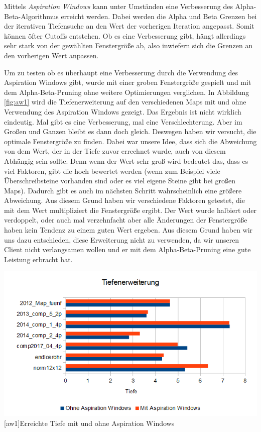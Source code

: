 \documentclass[12pt,a4paper,bibliography=totocnumbered,listof=totocnumbered]{scrartcl}
\begin{document}
    Mittels \textit{Aspiration Windows} kann unter Umständen eine Verbesserung des Alpha-Beta-Algorithmus erreicht werden. Dabei werden die Alpha und Beta Grenzen bei der iterativen Tiefensuche an den Wert der vorherigen Iteration angepasst. Somit können öfter Cutoffs entstehen. Ob es eine Verbesserung gibt, hängt allerdings sehr stark von der gewählten Fenstergröße ab, also inwiefern sich die Grenzen an den vorherigen Wert anpassen.
    
    Um zu testen ob es überhaupt eine Verbesserung durch die Verwendung des Aspiration Windows gibt, wurde mit einer groben Fenstergröße gespielt und mit dem Alpha-Beta-Pruning ohne weitere Optimierungen verglichen. In Abbildung \ref{fig:aw1} wird die Tiefenerweiterung auf den verschiedenen Maps mit und ohne Verwendung des Aspiration Windows gezeigt. Das Ergebnis ist nicht wirklich eindeutig. Mal gibt es eine Verbesserung, mal eine Verschlechterung. Aber im Großen und Ganzen bleibt es dann doch gleich. Deswegen haben wir versucht, die optimale Fenstergröße zu finden. Dabei war unsere Idee, dass sich die Abweichung von dem Wert, der in der Tiefe zuvor errechnet wurde, auch von diesem Abhängig sein sollte. Denn wenn der Wert sehr groß wird bedeutet das, dass es viel Faktoren, gibt die hoch bewertet werden (wenn zum Beispiel viele Überschreibsteine vorhanden sind oder es viel eigene Steine gibt bei großen Maps). Dadurch gibt es auch im nächsten Schritt wahrscheinlich eine größere Abweichung. 
    Aus diesem Grund haben wir verschiedene Faktoren getestet, die mit dem Wert multipliziert die Fenstergröße ergibt. Der Wert wurde halbiert oder verdoppelt, oder auch mal verzehnfacht aber alle Änderungen der Fenstergröße haben kein Tendenz zu einem guten Wert ergeben. 
    Aus diesem Grund haben wir uns dazu entschieden, diese Erweiterung nicht zu verwenden, da wir unseren Client nicht verlangsamen wollen und er mit dem Alpha-Beta-Pruning eine gute Leistung erbracht hat.
    
    \vspace{1em}
    \begin{minipage}{\linewidth}
    	\centering
    	\includegraphics[width=1\linewidth]{pics/Kapitel_4/VergleichAW2.png}
    	[aw1]{Erreichte Tiefe mit und ohne Aspiration Windows}
    	\label{fig:aw1}
    \end{minipage}
    \vspace{1em}
\end{document}
